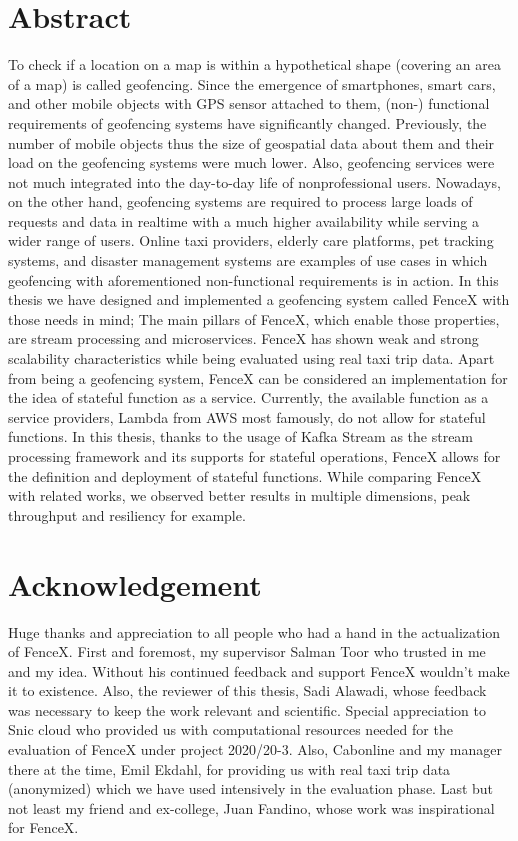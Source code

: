 \documentclass[a4]{report}
\begin{document}
    \section*{Abstract}
    To check if a location on a map is within a hypothetical shape (covering an area of a map) is called geofencing.
    Since the emergence of smartphones, smart cars, and other mobile objects with GPS sensor attached to them, (non-)
    functional requirements of geofencing systems have significantly changed.
    Previously, the number of mobile objects thus the size of geospatial data about them and their load on the
    geofencing systems were much lower.
    Also, geofencing services were not much integrated into the day-to-day life of nonprofessional users.
    Nowadays, on the other hand, geofencing systems are required to process large loads of requests and data in realtime with a much higher availability while serving a wider range of users.
    Online taxi providers, elderly care platforms, pet tracking systems, and disaster management systems are examples
    of use cases in which geofencing with aforementioned non-functional requirements is in action.
    In this thesis we have designed and implemented a geofencing system called FenceX with those needs in mind;
    The main pillars of FenceX, which enable those properties, are stream processing and microservices.
    FenceX has shown weak and strong scalability characteristics while being evaluated using real taxi trip data.
    Apart from being a geofencing system, FenceX can be considered an implementation for the idea of stateful function
    as a service.
    Currently, the available function as a service providers, Lambda from AWS most famously, do not allow for stateful
    functions.
    In this thesis, thanks to the usage of Kafka Stream as the stream processing framework and its supports for stateful
    operations, FenceX allows for the definition and deployment of stateful functions.
    While comparing FenceX with related works, we observed better results in multiple dimensions, peak throughput
    and resiliency for example.

    \section*{Acknowledgement}
    Huge thanks and appreciation to all people who had a hand in the actualization of FenceX.
    First and foremost, my supervisor Salman Toor who trusted in me and my idea.
    Without his continued feedback and support FenceX wouldn't make it to existence.
    Also, the reviewer of this thesis, Sadi Alawadi, whose feedback was necessary to keep the work relevant and
    scientific.
    Special appreciation to Snic cloud who provided us with computational resources needed for the evaluation of FenceX
    under project 2020/20-3.
    Also, Cabonline and my manager there at the time,  Emil Ekdahl, for providing us with real taxi trip data
    (anonymized) which we have used intensively in the evaluation phase.
    Last but not least my friend and ex-college, Juan Fandino, whose work was inspirational for FenceX.
\end{document}
